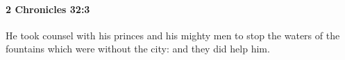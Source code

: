 
		\paragraph{2 Chronicles 32:3} %
			\label{2CHRONICLES-32-3}

			He took counsel with his princes and his mighty men to stop the waters of the fountains which were without the city: and they did help him.


